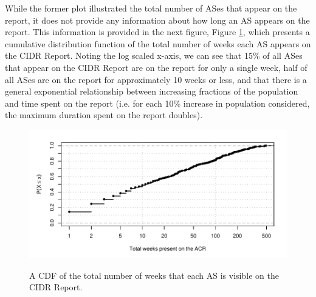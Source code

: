 While the former plot illustrated the total number of ASes that appear on the
report, it does not provide any information about how long an AS appears on the
report. This information is provided in the next figure, Figure
\ref{fig:cdf_weeks}, which presents a cumulative distribution function of the
total number of weeks each AS appears on the CIDR Report. Noting the log scaled
x-axis, we can see that 15\% of all ASes that appear on the CIDR Report
are on the report for only a single week, half of all ASes are on the report
for approximately 10 weeks or less, and that there is a general exponential
relationship between increasing fractions of the population and time spent on
the report (i.e. for each 10\% increase in population considered, the maximum
duration spent on the report doubles).

\begin{figure}[h!]
\begin{centering}
\begin{singlespace}
    \includegraphics[width=6in]{figures/acr_cdf_weeks.pdf}
    \vspace{-2em}\\
    \caption{A CDF of the total number of weeks that each AS is visible on the
    CIDR Report.}
    \label{fig:cdf_weeks}
\end{singlespace}
\end{centering}
\end{figure}

